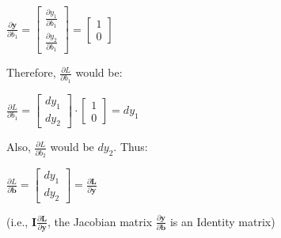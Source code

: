 \documentclass[12pt]{article}
\begin{document}
\begin{center}    
    $
    \frac{\partial\textbf{y}}{\partial b_{1}}=
    \left[\begin{matrix}
    \frac{\partial y_{1}}{\partial b_{1}} \\
    \frac{\partial y_{2}}{\partial b_{1}} 
    \end{matrix}\right]=
    \left[\begin{matrix}
    1\\
    0
    \end{matrix}\right]
    $
\end{center}Therefore, $\frac{\partial L}{\partial b_{1}}$ would be:
\begin{center}
    $
    \frac{\partial L}{\partial b_{1}}=
    \left[\begin{matrix}
    dy_{1} \\
    dy_{2}
    \end{matrix}\right]\cdot\left[\begin{matrix}
    1\\
    0
    \end{matrix}\right] = dy_{1}
    $
\end{center}Also, $\frac{\partial L}{\partial b_{2}}$ would be $dy_{2}$. Thus: 
\begin{center}
    $
    \frac{\partial L}{\partial \mathbf{b}}= 
    \left[\begin{matrix}
    dy_{1} \\
    dy_{2}
    \end{matrix}\right]=
    \frac{\partial\mathbf{L}}{\partial\mathbf{y}}
    $
    \begin{center}
        (i.e., $\mathbf{I}\frac{\partial\mathbf{L}}{\partial\mathbf{y}}$, the Jacobian matrix $\frac{\partial\mathbf{y}}{\partial\mathbf{b}}$ is an Identity matrix)
    \end{center}
\end{center}


\subsection*{}
\end{document}
